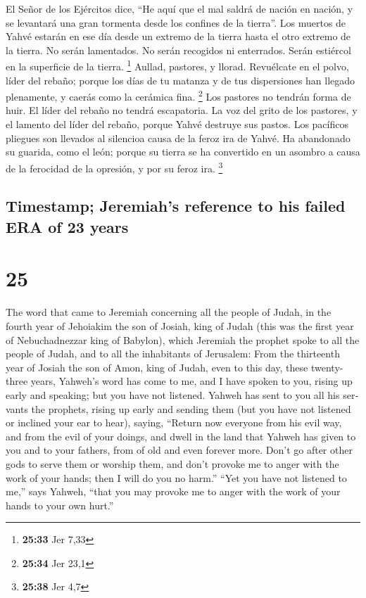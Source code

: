 \begin{paracol}{2}
 El Señor de los Ejércitos dice, ``He aquí que el mal
saldrá de nación en nación, y se levantará una gran tormenta desde los
confines de la tierra''.  Los muertos de Yahvé estarán en
ese día desde un extremo de la tierra hasta el otro extremo de la
tierra. No serán lamentados. No serán recogidos ni enterrados. Serán
estiércol en la superficie de la tierra. \footnote{\textbf{25:33} Jer
  7,33}  Aullad, pastores, y llorad. Revuélcate en el
polvo, líder del rebaño; porque los días de tu matanza y de tus
dispersiones han llegado plenamente, y caerás como la cerámica fina.
\footnote{\textbf{25:34} Jer 23,1}  Los pastores no
tendrán forma de huir. El líder del rebaño no tendrá escapatoria.
 La voz del grito de los pastores, y el lamento del líder
del rebaño, porque Yahvé destruye sus pastos.  Los
pacíficos pliegues son llevados al silencioa causa de la feroz ira de
Yahvé.  Ha abandonado su guarida, como el león; porque su
tierra se ha convertido en un asombro a causa de la ferocidad de la
opresión, y por su feroz ira. \footnote{\textbf{25:38} Jer 4,7}

\switchcolumn
\begin{otherlanguage}{english}

\hypertarget{timestamp-jeremiahs-reference-to-his-failed-era-of-23-years}{%
\subsection{Timestamp; Jeremiah's reference to his failed ERA of 23
years}\label{timestamp-jeremiahs-reference-to-his-failed-era-of-23-years}}

\hypertarget{section-49}{%
\section{25}\label{section-49}}

 The word that came to Jeremiah concerning all the people
of Judah, in the fourth year of Jehoiakim the son of Josiah, king of
Judah (this was the first year of Nebuchadnezzar king of Babylon),
 which Jeremiah the prophet spoke to all the people of
Judah, and to all the inhabitants of Jerusalem:  From the
thirteenth year of Josiah the son of Amon, king of Judah, even to this
day, these twenty-three years, Yahweh's word has come to me, and I have
spoken to you, rising up early and speaking; but you have not listened.
 Yahweh has sent to you all his servants the prophets,
rising up early and sending them (but you have not listened or inclined
your ear to hear),  saying, ``Return now everyone from his
evil way, and from the evil of your doings, and dwell in the land that
Yahweh has given to you and to your fathers, from of old and even
forever more.  Don't go after other gods to serve them or
worship them, and don't provoke me to anger with the work of your hands;
then I will do you no harm.''  ``Yet you have not listened
to me,'' says Yahweh, ``that you may provoke me to anger with the work
of your hands to your own hurt.''


\end{otherlanguage}
\end{paracol}
